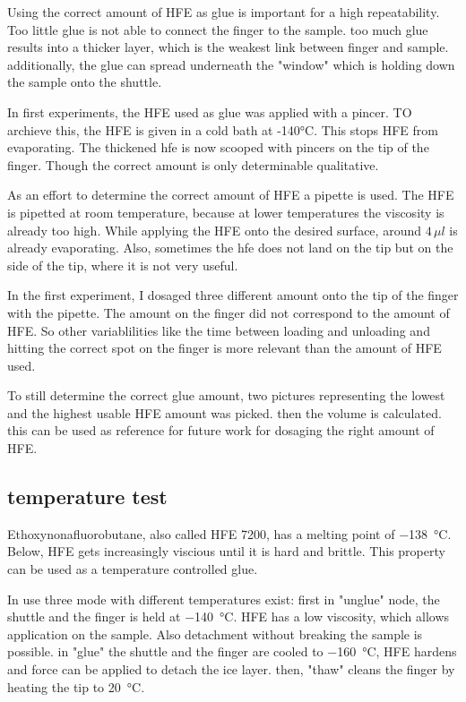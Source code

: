 Using the correct amount of HFE as glue is important for a high repeatability. Too little glue is not able to connect the finger to the sample. too much glue results into a thicker layer, which is the weakest link between finger and sample. additionally, the glue can spread underneath the "window" which is holding down the sample onto the shuttle. 

In first experiments, the HFE used as glue was applied with a pincer. TO archieve this, the HFE is given in a cold bath at -140°C. This stops HFE from evaporating. The thickened hfe is now scooped with pincers on the tip of the finger. Though the correct amount is only determinable qualitative.

As an effort to determine the correct amount of HFE a pipette is used. The HFE is pipetted at room temperature, because at lower temperatures the viscosity is already too high. While applying the HFE onto the desired surface, around $4\,\mu l$ is already evaporating. Also, sometimes the hfe does not land on the tip but on the side of the tip, where it is not very useful. 

In the first experiment, I dosaged three different amount onto the tip of the finger with the pipette. The amount on the finger did not correspond to the amount of HFE. So other variablilities like the time between loading and unloading and hitting the correct spot on the finger is more relevant than the amount of HFE used.

To still determine the correct glue amount, two pictures representing the lowest and the highest usable HFE amount was picked. then the volume is calculated. this can be used as reference for future work for dosaging the right amount of HFE.

\subsection{temperature test}

Ethoxynonafluorobutane, also called HFE 7200, has a melting point of \SI{-138}{\degreeCelsius}. Below, HFE gets increasingly viscious until it is hard and brittle. This property can be used as a temperature controlled glue. 

In use three mode with different temperatures exist: first in "unglue" node, the shuttle and the finger is held at \SI{-140}{\degreeCelsius}. HFE has a low viscosity, which allows application on the sample. Also detachment without breaking the sample is possible. in "glue" the shuttle and the finger are cooled to \SI{-160}{\degreeCelsius}, HFE hardens and force can be applied to detach the ice layer. then, "thaw" cleans the finger by heating the tip to \SI{20}{\degreeCelsius}. 

